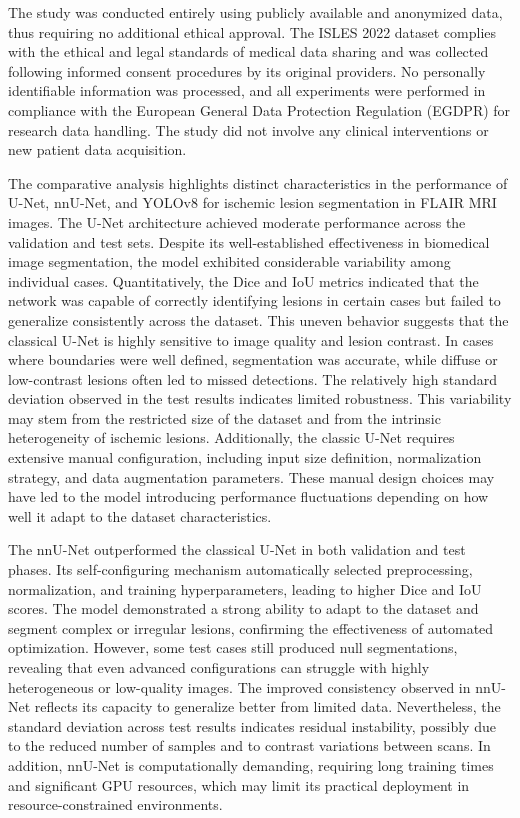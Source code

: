 \documentclass[12pt]{article}
\begin{document}
The study was conducted entirely using publicly available and anonymized data, thus requiring no additional ethical approval. The ISLES 2022 dataset complies with the ethical and legal standards of medical data sharing and was collected following informed consent procedures by its original providers.
%
No personally identifiable information was processed, and all experiments were performed in compliance with the European General Data Protection Regulation (EGDPR) for research data handling. The study did not involve any clinical interventions or new patient data acquisition.

The comparative analysis highlights distinct characteristics in the performance of U-Net, nnU-Net, and YOLOv8 for ischemic lesion segmentation in FLAIR MRI images.
%
The U-Net architecture achieved moderate performance across the validation and test sets. Despite its well-established effectiveness in biomedical image segmentation, the model exhibited considerable variability among individual cases. Quantitatively, the Dice and IoU metrics indicated that the network was capable of correctly identifying lesions in certain cases but failed to generalize consistently across the dataset. This uneven behavior suggests that the classical U-Net is highly sensitive to image quality and lesion contrast. In cases where boundaries were well defined, segmentation was accurate, while diffuse or low-contrast lesions often led to missed detections.
%
The relatively high standard deviation observed in the test results indicates limited robustness. This variability may stem from the restricted size of the dataset and from the intrinsic heterogeneity of ischemic lesions. Additionally, the classic U-Net requires extensive manual configuration, including input size definition, normalization strategy, and data augmentation parameters. These manual design choices may have led to the model introducing performance fluctuations depending on how well it adapt to the dataset characteristics.

The nnU-Net outperformed the classical U-Net in both validation and test phases. Its self-configuring mechanism automatically selected preprocessing, normalization, and training hyperparameters, leading to higher Dice and IoU scores. The model demonstrated a strong ability to adapt to the dataset and segment complex or irregular lesions, confirming the effectiveness of automated optimization. However, some test cases still produced null segmentations, revealing that even advanced configurations can struggle with highly heterogeneous or low-quality images.
%
The improved consistency observed in nnU-Net reflects its capacity to generalize better from limited data. Nevertheless, the standard deviation across test results indicates residual instability, possibly due to the reduced number of samples and to contrast variations between scans. In addition, nnU-Net is computationally demanding, requiring long training times and significant GPU resources, which may limit its practical deployment in resource-constrained environments.
\end{document}
